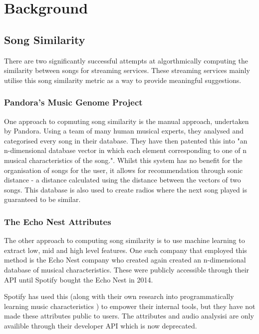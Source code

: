 \chapter{Background}
\section{Song Similarity}
There are two significantly successful attempts at algorthmically computing the similarity between songs for streaming services. These streaming services mainly utilise this song similarity metric as a way to provide meaningful suggestions.

\subsection{Pandora's Music Genome Project}
One approach to copmuting song similarity is the manual approach, undertaken by Pandora. Using a team of many human musical experts, they analysed and categorised every song in their database. They have then patented this into "an n-dimensional database vector in which each element corresponding to one of n musical characteristics of the song."\cite{pandoraPatent}. Whilst this system has no benefit for the organisation of songs for the user, it allows for recommendation through sonic distance - a distance calculated using the distance between the vectors of two songs. This database is also used to create radios where the next song played is guaranteed to be similar.

\subsection{The Echo Nest Attributes}
The other approach to computing song similarity is to use machine learning to extract low, mid and high level features. One such company that employed this method is the Echo Nest company who created again created an n-dimensional database of musical characteristics. These were publicly accessible through their API until Spotify bought the Echo Nest in 2014.

Spotify has used this (along with their own research into programmatically learning music characteristics \cite{spotify_ismir_21_machine_Learning}) to empower their internal tools\cite{how_spotify_uses_echo_nest}, but they have not made these attributes public to users. The attributes and audio analysisi are only availible through their developer API which is now deprecated.

